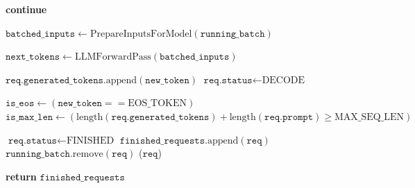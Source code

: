 \documentclass[11pt]{article}
\begin{document}
\begin{algorithm}[htbp]
\begin{algorithmic}[1]
            \State \textbf{continue}
        \EndIf
        
        \State {}
        \State $\texttt{batched\_inputs} \gets \text{PrepareInputsForModel}(\texttt{running\_batch})$
        
        \State {}
        \State $\texttt{next\_tokens} \gets \text{LLMForwardPass}(\texttt{batched\_inputs})$
        
        \State {}
            \State $\texttt{req.generated\_tokens}.\text{append}(\texttt{new\_token})$
            \State $\texttt{req.status} \gets \text{DECODE}$
            
            \State $\texttt{is\_eos} \gets (\texttt{new\_token} == \text{EOS\_TOKEN})$
            \State $\texttt{is\_max\_len} \gets (\text{length}(\texttt{req.generated\_tokens}) + \text{length}(\texttt{req.prompt}) \geq \text{MAX\_SEQ\_LEN})$
            
                \State $\texttt{req.status} \gets \text{FINISHED}$
                \State $\texttt{finished\_requests}.\text{append}(\texttt{req})$
                \State $\texttt{running\_batch}.\text{remove}(\texttt{req})$
                \State {}($\texttt{req}$) 
            \EndIf
            
        \EndFor
    \EndWhile
    \State \textbf{return} $\texttt{finished\_requests}$
\EndProcedure
\end{algorithmic}
\end{algorithm}
\end{document}
